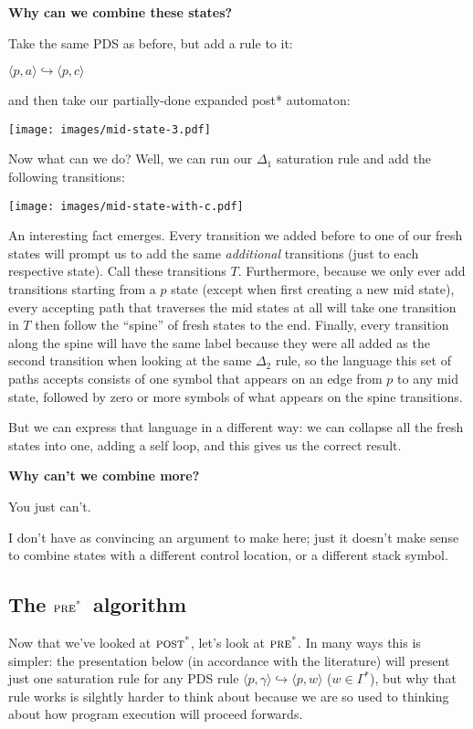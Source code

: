 \documentclass{article}
\newcommand{\Config}[2]{\ensuremath{\langle #1, #2 \rangle}}
\newcommand{\Rule}[2]{\ensuremath{#1 \hookrightarrow #2}}
\newcommand{\subsubsubsection}[1]{\textbf{#1}}
\newcommand{\poststar}{\ensuremath{\textsc{post}^\textsc{*}}}
\newcommand{\prestar}{\ensuremath{\textsc{pre}^\textsc{*}}}
\begin{document}
\subsubsubsection{Why can we combine these states?}

Take the same PDS as before, but add a rule to it:

    \Rule{\Config{p}{a}}{\Config{p}{c}}

and then take our partially-done expanded post* automaton:
\begin{center}
  \texttt{[image: images/mid-state-3.pdf]}
\end{center}

Now what can we do? Well, we can run our $\Delta_1$ saturation rule
and add the following transitions:
\begin{center}
  \texttt{[image: images/mid-state-with-c.pdf]}
\end{center}


An interesting fact emerges. Every transition we added before to one
of our fresh states will prompt us to add the same \emph{additional}
transitions (just to each respective state). Call these transitions
$T$.  Furthermore, because we only ever add transitions starting from
a $p$ state (except when first creating a new mid state), every
accepting path that traverses the mid states at all will take one
transition in $T$ then follow the ``spine'' of fresh states to the
end. Finally, every transition along the spine will have the same
label because they were all added as the second transition when
looking at the same $\Delta_2$ rule, so the language this set of paths
accepts consists of one symbol that appears on an edge from $p$ to any
mid state, followed by zero or more symbols of what appears on the
spine transitions.

But we can express that language in a different way: we can collapse
all the fresh states into one, adding a self loop, and this gives us
the correct result.

\subsubsubsection{Why can't we combine more?}

You just can't.

I don't have as convincing an argument to make here; just it doesn't
make sense to combine states with a different control location, or a
different stack symbol.


\subsection{The \prestar\ algorithm}

Now that we've looked at \poststar, let's look at \prestar. In many
ways this is simpler: the presentation below (in accordance with the
literature) will present just one saturation rule for any PDS rule
\Rule{\Config{p}{\gamma}}{\Config{p}{w}} ($w \in \Gamma^*$), but why
that rule works is silghtly harder to think about because we are so
used to thinking about how program execution will proceed forwards.
\end{document}
